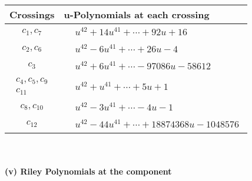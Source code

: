 \documentclass[1p]{elsarticle_modified}
\theoremstyle{definition}
\begin{document}
\begin{tabular}{m{50pt}|m{274pt}}
Crossings & \hspace{64pt}u-Polynomials at each crossing \\
\hline $$\begin{aligned}c_{1},c_{7}\end{aligned}$$&$\begin{aligned}
&u^{42}+14 u^{41}+\cdots+92 u+16
\end{aligned}$\\
\hline $$\begin{aligned}c_{2},c_{6}\end{aligned}$$&$\begin{aligned}
&u^{42}-6 u^{41}+\cdots+26 u-4
\end{aligned}$\\
\hline $$\begin{aligned}c_{3}\end{aligned}$$&$\begin{aligned}
&u^{42}+6 u^{41}+\cdots-97086 u-58612
\end{aligned}$\\
\hline $$\begin{aligned}c_{4},c_{5},c_{9}\\c_{11}\end{aligned}$$&$\begin{aligned}
&u^{42}+u^{41}+\cdots+5 u+1
\end{aligned}$\\
\hline $$\begin{aligned}c_{8},c_{10}\end{aligned}$$&$\begin{aligned}
&u^{42}-3 u^{41}+\cdots-4 u-1
\end{aligned}$\\
\hline $$\begin{aligned}c_{12}\end{aligned}$$&$\begin{aligned}
&u^{42}-44 u^{41}+\cdots+18874368 u-1048576
\end{aligned}$\\
\hline
\end{tabular}\\~\\
\newpage\renewcommand{\arraystretch}{1}
\flushleft \textbf{(v) Riley Polynomials at the component}\newline \\
\end{document}
